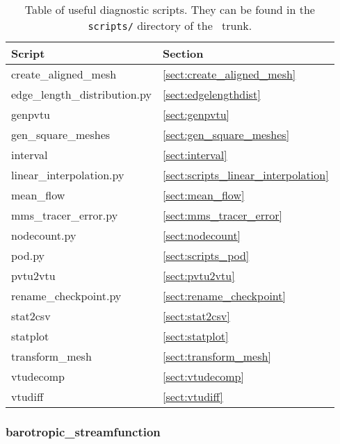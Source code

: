 \begin{table}
\begin{center}
  \begin{tabular}{| l | l |}
    \hline
	Script 					& Section 			\\
    \hline		
    	create\_aligned\_mesh 			& \ref{sect:create_aligned_mesh}\\
	edge\_length\_distribution.py		& \ref{sect:edgelengthdist} 	\\
	genpvtu					& \ref{sect:genpvtu}		\\
        gen\_square\_meshes			& \ref{sect:gen_square_meshes} 	\\		
    	interval				& \ref{sect:interval} 		\\
	linear\_interpolation.py		& \ref{sect:scripts_linear_interpolation} \\	
	mean\_flow				& \ref{sect:mean_flow}		\\
	mms\_tracer\_error.py			& \ref{sect:mms_tracer_error}	\\
	nodecount.py				& \ref{sect:nodecount}	\\
	pod.py					& \ref{sect:scripts_pod}	\\
	pvtu2vtu				& \ref{sect:pvtu2vtu}		\\
	rename\_checkpoint.py			& \ref{sect:rename_checkpoint}	\\
	stat2csv				& \ref{sect:stat2csv}		\\
    	statplot				& \ref{sect:statplot} 		\\
	transform\_mesh				& \ref{sect:transform_mesh}	\\
	vtudecomp				& \ref{sect:vtudecomp}		\\
	vtudiff					& \ref{sect:vtudiff}		\\
    \hline
  \end{tabular}
\end{center}
\caption[Table of useful diagnostic scripts]{Table of useful diagnostic scripts. They can be found in the \lstinline[language = bash]+scripts/+ directory of the \fluidity\ trunk.}
\label{tab:useful_diagnostic_scripts}
\end{table}


\subsubsection{barotropic\_streamfunction}
\label{sect:barotropic_streamfunction}

